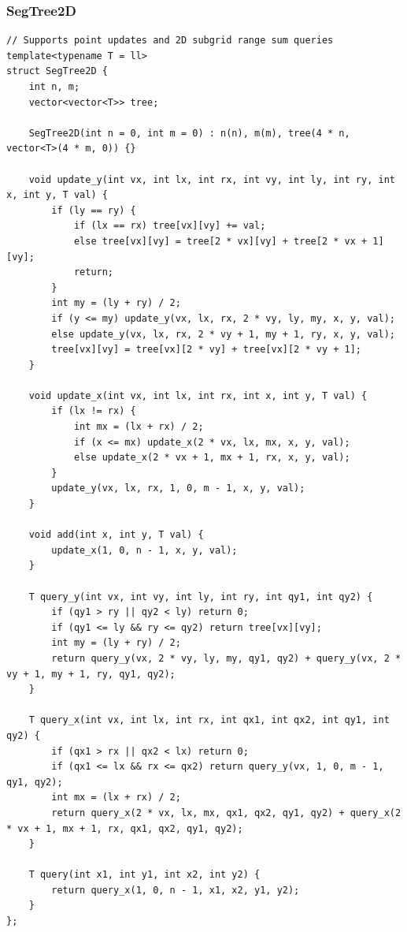 \documentclass[9pt,a4paper,twocolumn]{extarticle}
\begin{document}
\subsubsection{SegTree2D}
\nopagebreak
\begin{lstlisting}
// Supports point updates and 2D subgrid range sum queries
template<typename T = ll>
struct SegTree2D {
    int n, m;
    vector<vector<T>> tree;

    SegTree2D(int n = 0, int m = 0) : n(n), m(m), tree(4 * n, vector<T>(4 * m, 0)) {}

    void update_y(int vx, int lx, int rx, int vy, int ly, int ry, int x, int y, T val) {
        if (ly == ry) {
            if (lx == rx) tree[vx][vy] += val;
            else tree[vx][vy] = tree[2 * vx][vy] + tree[2 * vx + 1][vy];
            return;
        }
        int my = (ly + ry) / 2;
        if (y <= my) update_y(vx, lx, rx, 2 * vy, ly, my, x, y, val);
        else update_y(vx, lx, rx, 2 * vy + 1, my + 1, ry, x, y, val);
        tree[vx][vy] = tree[vx][2 * vy] + tree[vx][2 * vy + 1];
    }

    void update_x(int vx, int lx, int rx, int x, int y, T val) {
        if (lx != rx) {
            int mx = (lx + rx) / 2;
            if (x <= mx) update_x(2 * vx, lx, mx, x, y, val);
            else update_x(2 * vx + 1, mx + 1, rx, x, y, val);
        }
        update_y(vx, lx, rx, 1, 0, m - 1, x, y, val);
    }

    void add(int x, int y, T val) {
        update_x(1, 0, n - 1, x, y, val);
    }

    T query_y(int vx, int vy, int ly, int ry, int qy1, int qy2) {
        if (qy1 > ry || qy2 < ly) return 0;
        if (qy1 <= ly && ry <= qy2) return tree[vx][vy];
        int my = (ly + ry) / 2;
        return query_y(vx, 2 * vy, ly, my, qy1, qy2) + query_y(vx, 2 * vy + 1, my + 1, ry, qy1, qy2);
    }

    T query_x(int vx, int lx, int rx, int qx1, int qx2, int qy1, int qy2) {
        if (qx1 > rx || qx2 < lx) return 0;
        if (qx1 <= lx && rx <= qx2) return query_y(vx, 1, 0, m - 1, qy1, qy2);
        int mx = (lx + rx) / 2;
        return query_x(2 * vx, lx, mx, qx1, qx2, qy1, qy2) + query_x(2 * vx + 1, mx + 1, rx, qx1, qx2, qy1, qy2);
    }

    T query(int x1, int y1, int x2, int y2) {
        return query_x(1, 0, n - 1, x1, x2, y1, y2);
    }
};
\end{lstlisting}
\end{document}
